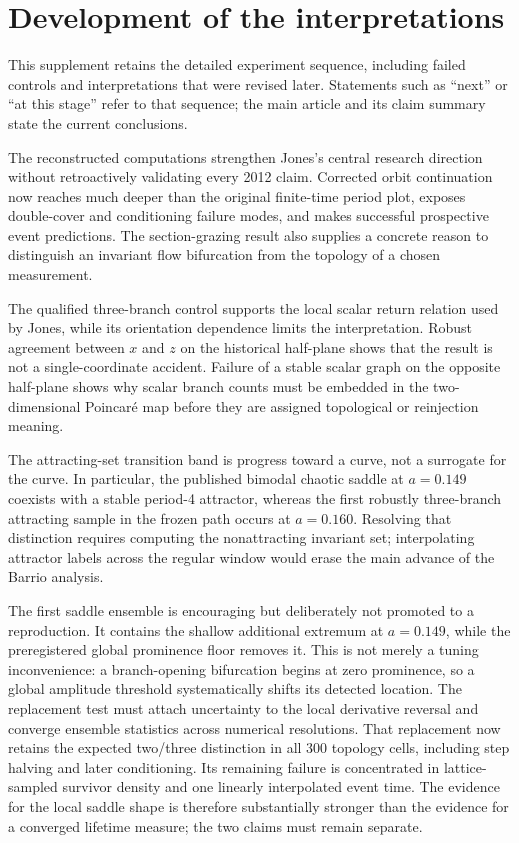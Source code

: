 \section{Development of the interpretations}
\label{supp:interpretation}

This supplement retains the detailed experiment sequence, including failed
controls and interpretations that were revised later.  Statements such as
``next'' or ``at this stage'' refer to that sequence; the main article and
its claim summary state the current conclusions.


The reconstructed computations strengthen Jones's central research direction
without retroactively validating every 2012 claim.  Corrected orbit continuation
now reaches much deeper than the original finite-time period plot, exposes
double-cover and conditioning failure modes, and makes successful prospective
event predictions.  The section-grazing result also supplies a concrete reason
to distinguish an invariant flow bifurcation from the topology of a chosen
measurement.

The qualified three-branch control supports the local scalar return relation
used by Jones, while its orientation dependence limits the interpretation.
Robust agreement between $x$ and $z$ on the
historical half-plane shows that the result is not a single-coordinate
accident.  Failure of a stable scalar graph on the opposite half-plane shows
why scalar branch counts must be embedded in the two-dimensional Poincar\'e
map before they are assigned topological or reinjection meaning.

The attracting-set transition band is progress toward a curve, not a surrogate
for the curve.  In particular, the published bimodal chaotic saddle at
$a=0.149$ coexists with a stable period-4 attractor, whereas the first robustly
three-branch attracting sample in the frozen path occurs at $a=0.160$.
Resolving that distinction requires computing the nonattracting invariant set;
interpolating attractor labels across the regular window would erase the main
advance of the Barrio analysis.

The first saddle ensemble is encouraging but deliberately not promoted to a
reproduction.  It contains the shallow additional extremum at $a=0.149$, while
the preregistered global prominence floor removes it.  This is not merely a
tuning inconvenience: a branch-opening bifurcation begins at zero prominence,
so a global amplitude threshold systematically shifts its detected location.
The replacement test must attach uncertainty to the local derivative reversal
and converge ensemble statistics across numerical resolutions.  That
replacement now retains the expected two/three distinction in all 300 topology
cells, including step halving and later conditioning.  Its remaining failure
is concentrated in lattice-sampled survivor density and one linearly
interpolated event time.  The evidence for the local saddle shape is therefore
substantially stronger than the evidence for a converged lifetime measure; the
two claims must remain separate.

